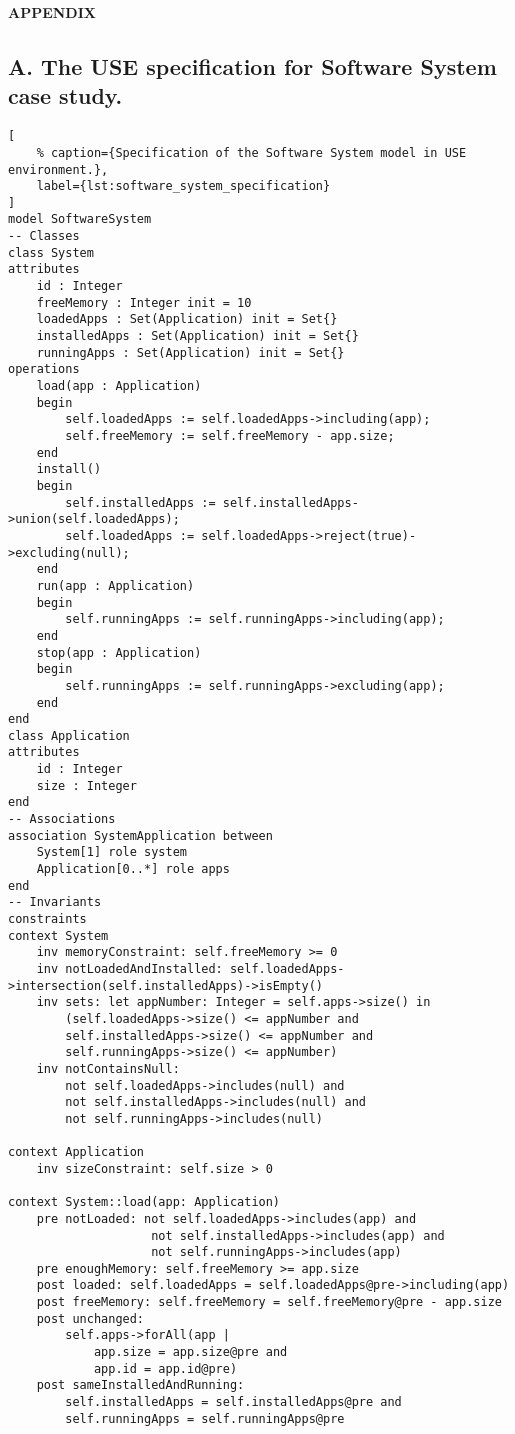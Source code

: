 \begin{center}
\textbf{\fontsize{22}{0}\selectfont APPENDIX}
\end{center}

\subsection*{A. The USE specification for Software System case study.}

\begin{lstlisting}[
    % caption={Specification of the Software System model in USE environment.},
    label={lst:software_system_specification}
]
model SoftwareSystem
-- Classes
class System
attributes
    id : Integer
    freeMemory : Integer init = 10
    loadedApps : Set(Application) init = Set{}
    installedApps : Set(Application) init = Set{}
    runningApps : Set(Application) init = Set{}
operations
    load(app : Application)
    begin
        self.loadedApps := self.loadedApps->including(app);
        self.freeMemory := self.freeMemory - app.size;
    end
    install()
    begin
        self.installedApps := self.installedApps->union(self.loadedApps);
        self.loadedApps := self.loadedApps->reject(true)->excluding(null);
    end
    run(app : Application)
    begin
        self.runningApps := self.runningApps->including(app);
    end
    stop(app : Application)
    begin
        self.runningApps := self.runningApps->excluding(app);
    end
end
class Application
attributes
    id : Integer
    size : Integer
end
-- Associations
association SystemApplication between
    System[1] role system
    Application[0..*] role apps
end
-- Invariants
constraints
context System
    inv memoryConstraint: self.freeMemory >= 0
    inv notLoadedAndInstalled: self.loadedApps->intersection(self.installedApps)->isEmpty()
    inv sets: let appNumber: Integer = self.apps->size() in
        (self.loadedApps->size() <= appNumber and
        self.installedApps->size() <= appNumber and
        self.runningApps->size() <= appNumber)
    inv notContainsNull:
        not self.loadedApps->includes(null) and
        not self.installedApps->includes(null) and
        not self.runningApps->includes(null)

context Application
    inv sizeConstraint: self.size > 0

context System::load(app: Application)
    pre notLoaded: not self.loadedApps->includes(app) and
                    not self.installedApps->includes(app) and
                    not self.runningApps->includes(app)
    pre enoughMemory: self.freeMemory >= app.size
    post loaded: self.loadedApps = self.loadedApps@pre->including(app)
    post freeMemory: self.freeMemory = self.freeMemory@pre - app.size
    post unchanged:
        self.apps->forAll(app |
            app.size = app.size@pre and
            app.id = app.id@pre)
    post sameInstalledAndRunning:
        self.installedApps = self.installedApps@pre and
        self.runningApps = self.runningApps@pre


\end{lstlisting}
